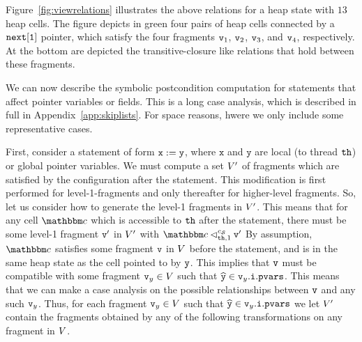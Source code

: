 
Figure~\ref{fig:viewrelations} illustrates the above relations for a heap state
with $13$ heap cells. The figure depicts in green
four pairs of heap cells connected by a $\tt next[1]$ pointer, which satisfy
the four fragments $\mathtt{v}_1$, $\mathtt{v}_2$, $\mathtt{v}_3$, and $\mathtt{v}_4$, respectively.
At the bottom are depicted the transitive-closure like relations that hold
between these fragments.

We can now describe the symbolic postcondition computation for
statements that affect pointer variables or fields. This is a long
case analysis, which is described in full in Appendix~\ref{app:skiplists}.
For space reasons, hwere we only include some representative cases.

First, consider a statement of form
${\tt x := y}$, where $\mathtt{x}$ and $\mathtt{y}$ are local
(to thread ${\tt th}$) or global pointer variables.
We must compute a set $V'$ of
fragments which are satisfied by the configuration after the statement.
This modification is first performed for
level-1-fragments and only thereafter for higher-level fragments.
So, let us consider how to generate the level-1 fragments in $V'$. This
means that for any cell $\cell$ which is accessible to ${\tt th}$ after
the statement, there must be some level-1 fragment $\mathtt{v}'$ in $V'$
with $\cell \lsatfrag{1}{\thread}{\sconf} \frag'$
By assumption, $\cell$ satisfies some fragment $\mathtt{v}$ in $V$
before the statement, and is in the same heap state as the cell pointed to by
$\mathtt{y}$.
This implies that $\mathtt{v}$ must be compatible with some
fragment $\mathtt{v}_y\in V$ such that $\widehat{\mathtt{y}} \in \mathtt{v}_y.\mathtt{i}.\mathtt{pvars}$. This means that we can make a case analysis on the possible relationships
between $\mathtt{v}$ and any such $\mathtt{v}_y$.
Thus, for each fragment $\mathtt{v}_y\in V$ such that
$\widehat{\mathtt{y}} \in \mathtt{v}_y.\mathtt{i}.\mathtt{pvars}$ we let $V'$ contain
the fragments obtained by any of the following transformations on any fragment in
$V$.
